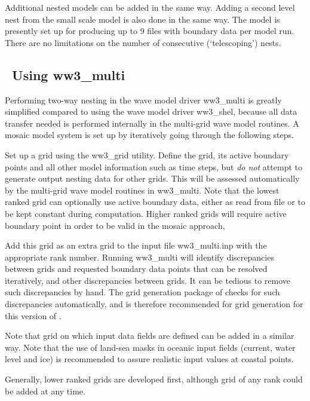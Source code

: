 \noindent
Additional nested models can be added in the same way. Adding a second level
nest from the small scale model is also done in the same way. The model is
presently set up for producing up to 9 files with boundary data per model
run. There are no limitations on the number of consecutive (`telescoping')
nests.

\vssub
\subsection{~Using {\file ww3\_multi}}
\vssub

Performing two-way nesting in the wave model driver {\file ww3\_multi} is
greatly simplified compared to using the wave model driver {\file ww3\_shel},
because all data transfer needed is performed internally in the multi-grid
wave model routines. A mosaic model system is set up by iteratively going
through the following steps.

\begin{list}{)}{
             \rightmargin 5mm 
              \leftmargin 10mm}

\item Set up a grid using the {\file ww3\_grid} utility. Define the grid, its
      active boundary points and all other model information such as time
      steps, but {\it do not} attempt to generate output nesting data for
      other grids. This will be assessed automatically by the multi-grid wave
      model routines in {\file ww3\_multi}. Note that the lowest ranked grid
      can optionally use active boundary data, either as read from file or to
      be kept constant during computation. Higher ranked grids will require
      active boundary point in order to be valid in the mosaic approach,

\item Add this grid as an extra grid to the input file {\file ww3\_multi.inp}
      with the appropriate rank number. Running {\file ww3\_multi} will
      identify discrepancies between grids and requested boundary data points
      that can be resolved iteratively, and other discrepancies between grids.
      It can be tedious to remove such discrepancies by hand. The grid
      generation package of \citet{tol:MMAB07a, tol:OMOD08a} checks for such
      discrepancies automatically, and is therefore recommended for grid
      generation for this version of \ws.

\end{list}

\noindent
Note that grid on which input data fields are defined can be added in a
similar way. Note that the use of land-sea masks in oceanic input fields
(current, water level and ice) is recommended to assure realistic input values
at coastal points.

Generally, lower ranked grids are developed first, although grid of any rank
could be added at any time.

